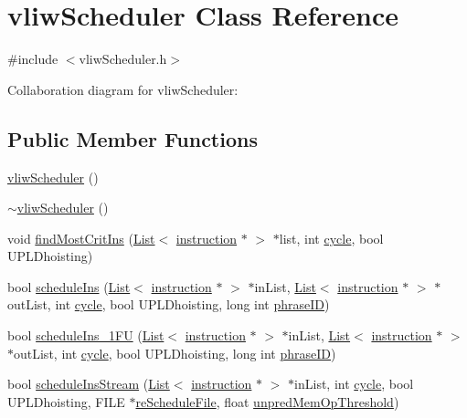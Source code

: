 \hypertarget{classvliwScheduler}{
\section{vliwScheduler Class Reference}
\label{classvliwScheduler}
}


{\ttfamily \#include $<$vliwScheduler.h$>$}



Collaboration diagram for vliwScheduler:
\subsection*{Public Member Functions}
\begin{DoxyCompactItemize}
\item 
\hyperlink{classvliwScheduler_a99727364e47615fde6a54426b135df7a}{vliwScheduler} ()
\item 
\hyperlink{classvliwScheduler_a845a2546d4f6eccf05a853c3f56f30d6}{$\sim$vliwScheduler} ()
\item 
void \hyperlink{classvliwScheduler_afa9961197e83bf8ac47cc7f15232b70c}{findMostCritIns} (\hyperlink{classList}{List}$<$ \hyperlink{classinstruction}{instruction} $\ast$ $>$ $\ast$list, int \hyperlink{vliwScheduler_8cpp_a1f4871d45089b039d95d3832dd123827}{cycle}, bool UPLDhoisting)
\item 
bool \hyperlink{classvliwScheduler_a29a8e438bea013f48b2cc7b3e672dfe6}{scheduleIns} (\hyperlink{classList}{List}$<$ \hyperlink{classinstruction}{instruction} $\ast$ $>$ $\ast$inList, \hyperlink{classList}{List}$<$ \hyperlink{classinstruction}{instruction} $\ast$ $>$ $\ast$outList, int \hyperlink{vliwScheduler_8cpp_a1f4871d45089b039d95d3832dd123827}{cycle}, bool UPLDhoisting, long int \hyperlink{bkEnd_8cpp_a3709ef01c299a1b84a1b023b9a44d4bc}{phraseID})
\item 
bool \hyperlink{classvliwScheduler_a6b42ca4f7436dc7dfac2848dabc10416}{scheduleIns\_\-1FU} (\hyperlink{classList}{List}$<$ \hyperlink{classinstruction}{instruction} $\ast$ $>$ $\ast$inList, \hyperlink{classList}{List}$<$ \hyperlink{classinstruction}{instruction} $\ast$ $>$ $\ast$outList, int \hyperlink{vliwScheduler_8cpp_a1f4871d45089b039d95d3832dd123827}{cycle}, bool UPLDhoisting, long int \hyperlink{bkEnd_8cpp_a3709ef01c299a1b84a1b023b9a44d4bc}{phraseID})
\item 
bool \hyperlink{classvliwScheduler_a0c1dd56c752aee739de1aa373fc16078}{scheduleInsStream} (\hyperlink{classList}{List}$<$ \hyperlink{classinstruction}{instruction} $\ast$ $>$ $\ast$inList, int \hyperlink{vliwScheduler_8cpp_a1f4871d45089b039d95d3832dd123827}{cycle}, bool UPLDhoisting, FILE $\ast$\hyperlink{bkEnd_8cpp_a0e5f51d6a6b1d82437b223b600c984c2}{reScheduleFile}, float \hyperlink{binaryTranslator_2dot_8cpp_a88cfebd9f1e296c291bf05c5a78a6177}{unpredMemOpThreshold})

\end{DoxyCompactItemize}
